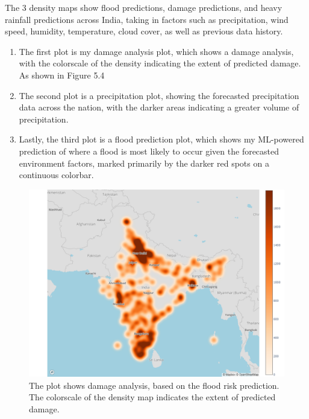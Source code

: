 \documentclass[a4paper,12pt]{report}
\begin{document}
The 3 density maps show flood predictions, damage predictions, and heavy rainfall predictions across India, taking in factors such as precipitation, wind speed, humidity, temperature, cloud cover, as well as previous data history.

\begin{enumerate}
    \item The first plot is my damage analysis plot, which shows a damage analysis, with the colorscale of the density indicating the extent of predicted damage. As shown in Figure 5.4
    \item The second plot is a precipitation plot, showing the forecasted precipitation data across the nation, with the darker areas indicating a greater volume of precipitation.
    \item Lastly, the third plot is a flood prediction plot, which shows my ML-powered prediction of where a flood is most likely to occur given the forecasted environment factors, marked primarily by the darker red spots on a continuous colorbar.
\end{enumerate}

\begin{figure}[ht]
  \centering
  \includegraphics[width=\linewidth]{heatmap1.png}
  \caption{The plot shows damage analysis, based on the flood risk prediction. The colorscale of the density map indicates the extent of predicted damage.}
\end{figure}
\end{document}
